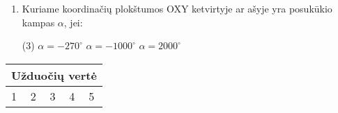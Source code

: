 \documentclass[a4paper]{article}
\begin{document}
\begin{enumerate}
      \item Kuriame koordinačių plokštumos OXY ketvirtyje ar ašyje yra
            posukūkio kampas $\alpha$, jei:

            \begin{tasks}[item-format={\normalfont},
                        after-item-skip=4mm](3)
                  \task $\alpha = -270^\circ$
                  \task $\alpha = -1000^\circ$
                  \task $\alpha = 2000^\circ$
            \end{tasks}

\end{enumerate}

\begin{table}[!htpb]
      \centering
      \begin{tabular}{|lllllllllllllll|}
            \hline
            \multicolumn{15}{|l|}{Užduočių vertė}

            \\ \hline
            \multicolumn{3}{|l|}{1}

             & \multicolumn{2}{l|}{2}

             & \multicolumn{4}{l|}{3}

             &
            \multicolumn{3}{l|}{4}

             & \multicolumn{3}{l|}{5}


\end{tabular}
\end{table}
\end{document}
